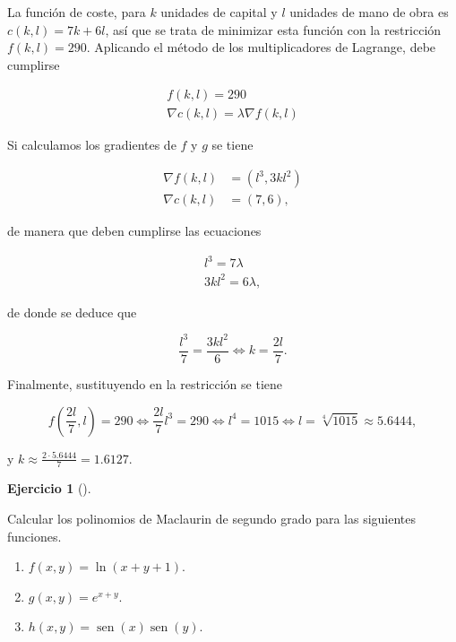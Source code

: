 \documentclass[
  spanish,
  a4paper,
]{scrreport}
\providecommand{\tightlist}{%
  \setlength{\itemsep}{0pt}\setlength{\parskip}{0pt}}
\theoremstyle{definition}
\newtheorem{exercise}{Ejercicio}[chapter]
\theoremstyle{remark}
\begin{document}
\begin{tcolorbox}[enhanced jigsaw, arc=.35mm, bottomrule=.15mm, bottomtitle=1mm, breakable, colback=white, colbacktitle=quarto-callout-tip-color!10!white, colframe=quarto-callout-tip-color-frame, coltitle=black, left=2mm, leftrule=.75mm, opacityback=0, opacitybacktitle=0.6, rightrule=.15mm, title=\textcolor{quarto-callout-tip-color}{\faLightbulb}\hspace{0.5em}{Solución}, titlerule=0mm, toprule=.15mm, toptitle=1mm]

La función de coste, para \(k\) unidades de capital y \(l\) unidades de
mano de obra es \(c(k,l) = 7k+6l\), así que se trata de minimizar esta
función con la restricción \(f(k,l)=290\). Aplicando el método de los
multiplicadores de Lagrange, debe cumplirse

\[
\begin{gathered}
f(k,l) = 290 \\
\nabla c(k,l) = \lambda\nabla f(k,l)
\end{gathered}
\]

Si calculamos los gradientes de \(f\) y \(g\) se tiene

\begin{align*}
\nabla f(k,l) &= (l^3, 3kl^2)\\
\nabla c(k,l) &= (7, 6),
\end{align*}

de manera que deben cumplirse las ecuaciones

\[
\begin{gathered}
l^3 = 7\lambda \\
3kl^2 = 6\lambda,
\end{gathered}
\]

de donde se deduce que

\[
\frac{l^3}{7} = \frac{3kl^2}{6} 
\Leftrightarrow k = \frac{2l}{7}.
\]

Finalmente, sustituyendo en la restricción se tiene

\[
f\left(\frac{2l}{7}, l\right) = 290
\Leftrightarrow \frac{2l}{7}l^3 = 290
\Leftrightarrow l^4 = 1015
\Leftrightarrow l = \sqrt[4]{1015} \approx 5.6444,
\]

y \(k \approx \frac{2\cdot 5.6444}{7} = 1.6127.\)

\end{tcolorbox}

\begin{exercise}[]\protect\hypertarget{exr-polinomios-maclaurin-dos-variables}{}\label{exr-polinomios-maclaurin-dos-variables}

Calcular los polinomios de Maclaurin de segundo grado para las
siguientes funciones.

\begin{enumerate}
\def\labelenumi{\alph{enumi}.}
\tightlist
\item
  \(f(x,y) = \ln(x+y+1)\).
\item
  \(g(x,y) = e^{x+y}\).
\item
  \(h(x,y) = \operatorname{sen}(x)\operatorname{sen}(y)\).
\end{enumerate}

\end{exercise}
\end{document}

